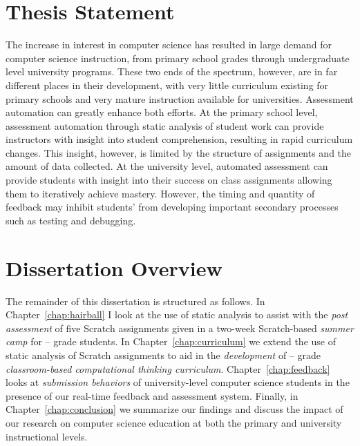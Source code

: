 \section{Thesis Statement}
The increase in interest in computer science has resulted in large demand for
computer science instruction, from primary school grades through undergraduate
level university programs. These two ends of the spectrum, however, are in far
different places in their development, with very little curriculum existing for
primary schools and very mature instruction available for
universities. Assessment automation can greatly enhance both efforts. At the
primary school level, assessment automation through static analysis of student
work can provide instructors with insight into student comprehension, resulting
in rapid curriculum changes. This insight, however, is limited by the structure
of assignments and the amount of data collected. At the university level,
automated assessment can provide students with insight into their success on
class assignments allowing them to iteratively achieve mastery. However, the
timing and quantity of feedback may inhibit students' from developing important
secondary processes such as testing and debugging.

\section{Dissertation Overview}
The remainder of this dissertation is structured as follows. In
Chapter~\ref{chap:hairball} I look at the use of static analysis to assist with
the \emph{post assessment} of five Scratch assignments given in a two-week
Scratch-based \emph{summer camp} for -- grade students. In
Chapter~\ref{chap:curriculum} we extend the use of static analysis of Scratch
assignments to aid in the \emph{development} of -- grade
\emph{classroom-based computational thinking
  curriculum}. Chapter~\ref{chap:feedback} looks at \emph{submission behaviors}
of university-level computer science students in the presence of our real-time
feedback and assessment system. Finally, in Chapter~\ref{chap:conclusion} we
summarize our findings and discuss the impact of our research on computer
science education at both the primary and university instructional levels.
